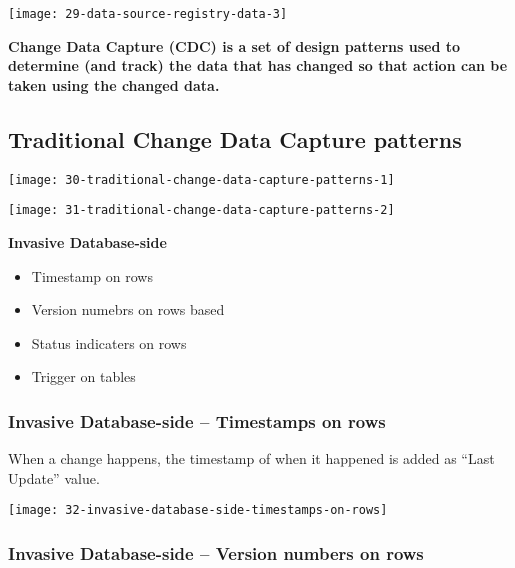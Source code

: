 \hrulefill

\begin{center}
\texttt{[image: 29-data-source-registry-data-3]}
\end{center}

\begin{center}
\textbf{Change Data Capture (CDC) is a set of design patterns used to determine (and track) the data that has changed so that action can be taken using the changed data.}
\end{center}

\subsection{Traditional Change Data Capture patterns}

\begin{center}
\texttt{[image: 30-traditional-change-data-capture-patterns-1]}
\end{center}

\begin{center}
\texttt{[image: 31-traditional-change-data-capture-patterns-2]}
\end{center}

\textbf{Invasive Database-side}
\begin{itemize}
	\item Timestamp on rows
	\item Version numebrs on rows based
	\item Status indicaters on rows
	\item Trigger on tables
\end{itemize}

\subsubsection{Invasive Database-side – Timestamps on rows}

When a change happens, the timestamp of when it happened is added as “Last Update” value.

\begin{center}
\texttt{[image: 32-invasive-database-side-timestamps-on-rows]}
\end{center}

\subsubsection{Invasive Database-side – Version numbers on rows}

